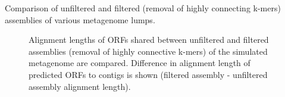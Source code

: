 \documentclass[11pt]{article} %
\begin{document}
\begin{table}
\caption{Comparison of unfiltered and filtered (removal of highly connecting k-mers) assemblies of various metagenome lumps.}
\end{table}

\begin{figure}
\caption{Alignment lengths of ORFs shared between unfiltered and filtered assemblies (removal of highly connective k-mers) of the simulated metagenome are compared.  Difference in alignment length of predicted ORFs to contigs is shown (filtered assembly - unfiltered assembly alignment length).}
\end{figure}
\end{document}
